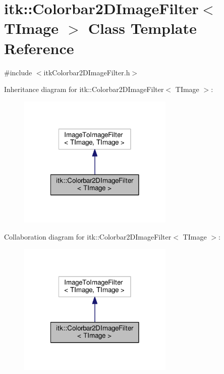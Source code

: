 \hypertarget{classitk_1_1_colorbar2_d_image_filter}{\section{itk\-:\-:Colorbar2\-D\-Image\-Filter$<$ T\-Image $>$ Class Template Reference}
\label{classitk_1_1_colorbar2_d_image_filter}
}


{\ttfamily \#include $<$itk\-Colorbar2\-D\-Image\-Filter.\-h$>$}



Inheritance diagram for itk\-:\-:Colorbar2\-D\-Image\-Filter$<$ T\-Image $>$\-:
\nopagebreak
\begin{figure}[H]
\begin{center}
\leavevmode
\includegraphics[width=210pt]{classitk_1_1_colorbar2_d_image_filter__inherit__graph}
\end{center}
\end{figure}


Collaboration diagram for itk\-:\-:Colorbar2\-D\-Image\-Filter$<$ T\-Image $>$\-:
\nopagebreak
\begin{figure}[H]
\begin{center}
\leavevmode
\includegraphics[width=210pt]{classitk_1_1_colorbar2_d_image_filter__coll__graph}
\end{center}
\end{figure}
